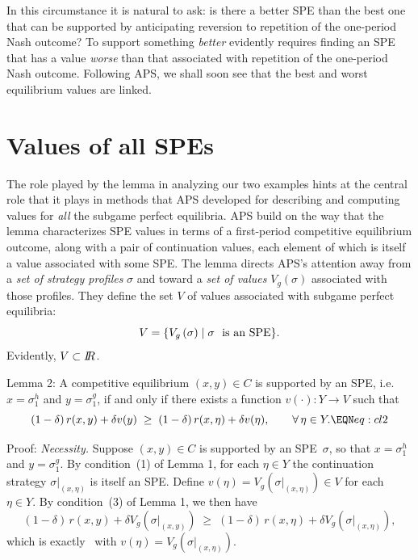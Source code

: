 In this circumstance it is natural to ask: is there  a better SPE than  the best one that can be supported by anticipating reversion to repetition
of the one-period Nash outcome?
 To support something {\it better\/} evidently requires finding an SPE
that has a value {\it worse\/} than that
associated with repetition of the one-period Nash outcome.
  Following APS, we shall soon
see that the best and worst equilibrium values are linked.

    
\section{Values of all SPEs}
The role played by the lemma in analyzing our two examples
hints at the central role that it plays in  methods
that APS  developed for describing
and computing  values for
 {\it all\/} the subgame perfect equilibria.%
 APS build on the way that the lemma
characterizes SPE values in terms of a first-period competitive  equilibrium
outcome, along with a pair of continuation values, each element of
which is itself a value associated with some SPE. The lemma
directs APS's attention away from a {\it set of strategy
profiles\/}  $\sigma$ and toward a {\it set of values\/}
 $V_g(\sigma)$ associated
with those profiles.  They define the set $V$ of values associated with
subgame perfect equilibria:
$$V=\{ V_g\, (\sigma)\mid \sigma\ \hbox{ is an SPE}
\}.$$
Evidently, $V\subset {{I\kern-0.3em R}}$.  

\medskip\noindent
{\sc Lemma 2:} 
A competitive equilibrium $(x,y)\in C$ is supported by an SPE, i.e.\
$x=\sigma^h_1$ and $y=\sigma^g_1$, if and only if there exists a
function $v(\cdot):Y\to V$ such that
%
$$  (1-\delta)\,r(x,y)+\delta v(y)
    \;\geq\;
    (1-\delta)\,r(x,\eta)+\delta v(\eta) ,
    \qquad \forall\,\eta\in Y .
    \EQN eq:cl2  $$

    \medskip\noindent
{\sc Proof:}
{\sl Necessity.\/}
Suppose $(x,y)\in C$ is supported by an SPE~$\sigma$, so that
$x=\sigma^h_1$ and $y=\sigma^g_1$.
By condition~(1) of Lemma 1, for each $\eta\in Y$ the
continuation strategy $\sigma|_{(x,\eta)}$ is itself an SPE.
Define $v(\eta)=V_g(\sigma|_{(x,\eta)})\in V$ for each $\eta\in Y$.
By condition~(3) of Lemma 1, we then have
$$  (1-\delta)\,r(x,y)+\delta V_g(\sigma|_{(x,y)})
    \;\geq\;
    (1-\delta)\,r(x,\eta)+\delta V_g(\sigma|_{(x,\eta)}) ,  $$
which is exactly~ with $v(\eta)=V_g(\sigma|_{(x,\eta)})$.

